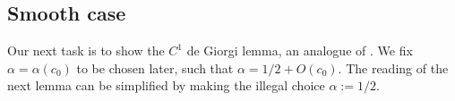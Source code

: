 \documentclass[reqno,10pt]{amsart}
\DeclareMathOperator{\Exc}{Exc}
\newcommand*\dif{\mathop{}\!\mathrm{d}}
\newtheorem{lemma}[theorem]{Lemma}
\theoremstyle{definition}
\numberwithin{equation}{section}
\begin{document}


\subsection{Smooth case} 
Our next task is to show the $C^1$ de Giorgi lemma, an analogue of \cite[Teorema 4.4]{Miranda66}.
We fix $\alpha = \alpha(c_0)$ to be chosen later, such that $\alpha = 1/2 + O(c_0)$.
The reading of the next lemma can be simplified by making the illegal choice $\alpha := 1/2$.
\end{document}
